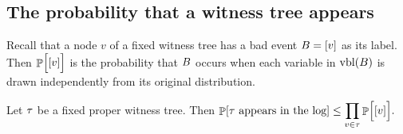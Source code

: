\subsection{The probability that a witness tree appears}

Recall that a node $v$ of a fixed witness tree has a bad event
${B} = \left[ v \right]$ as its label. Then $\Prob{\Bigl.\LabelX{v}}$
is the probability that ${B}$ occurs when each variable in
$\vblX{\BEvent}$ is drawn independently from its original distribution.

\begin{lemma}
    Let $\tau$ be a fixed proper witness tree. Then
    \begin{math}
        \ds \Prob{\WTree \text{ appears in the log}}%
        \leq%
        \prod_{v \in \WTree} \Prob{\Bigl.\LabelX{v}}.
    \end{math}
\end{lemma}


